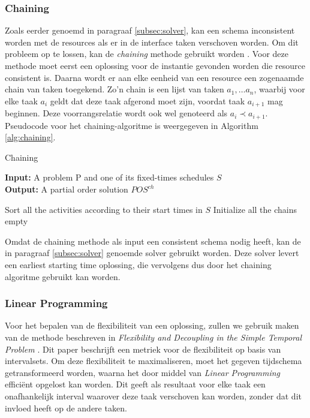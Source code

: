 \subsubsection*{Chaining}
Zoals eerder genoemd in paragraaf \ref{subsec:solver}, kan een schema inconsistent worden met de resources als er in de interface taken verschoven worden. Om dit probleem op te lossen, kan de \emph{chaining} methode gebruikt worden \cite{policella2007precedence}. Voor deze methode moet eerst een oplossing voor de instantie gevonden worden die resource consistent is. Daarna wordt er aan elke eenheid van een resource een zogenaamde chain van taken toegekend. Zo'n chain is een lijst van taken $a_1, \dots a_n$, waarbij voor elke taak $a_i$ geldt dat deze taak afgerond moet zijn, voordat taak $a_{i+1}$ mag beginnen. Deze voorrangsrelatie wordt ook wel genoteerd als $a_i \prec a_{i+1}$. Pseudocode voor het chaining-algoritme is weergegeven in Algorithm \ref{alg:chaining}.

\begin{algorithm}
\caption{Chaining \cite{policella2007precedence} }\label{alg:chaining}
\textbf{Input:} A problem P and one of its fixed-times schedules $S$ \\
\textbf{Output:} A partial order solution $POS^{ch}$
\begin{algorithmic}[1]
    \State Sort all the activities according to their start times in $S$  
    \State Initialize all the chains empty
        \EndFor
      \EndFor
    \EndFor
  \EndFunction
\end{algorithmic}
\end{algorithm}

Omdat de chaining methode als input een consistent schema nodig heeft, kan de in paragraaf \ref{subsec:solver} genoemde solver gebruikt worden. Deze solver levert een earliest starting time oplossing, die vervolgens dus door het chaining algoritme gebruikt kan worden.


\subsubsection*{Linear Programming}
Voor het bepalen van de flexibiliteit van een oplossing, zullen we gebruik maken van de methode beschreven in \emph{Flexibility and Decoupling in the Simple Temporal Problem} \cite{wilson2013flexibility}. Dit paper beschrijft een metriek voor de flexibiliteit op basis van intervalsets. Om deze flexibiliteit te maximaliseren, moet het gegeven tijdschema getransformeerd worden, waarna het door middel van \emph{Linear Programming} effici\"ent opgelost kan worden. Dit geeft als resultaat voor elke taak een onafhankelijk interval waarover deze taak verschoven kan worden, zonder dat dit invloed heeft op de andere taken.

